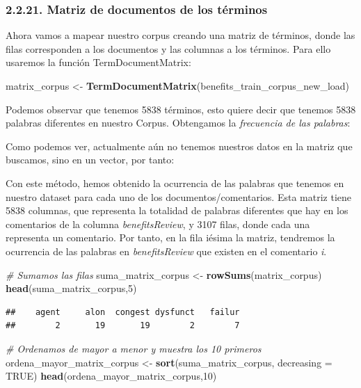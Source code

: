 \documentclass[spanish,]{article}
\newenvironment{Shaded}{\begin{snugshade}}{\end{snugshade}}
\newcommand{\KeywordTok}[1]{\textcolor[rgb]{0.13,0.29,0.53}{\textbf{#1}}}
\newcommand{\DataTypeTok}[1]{\textcolor[rgb]{0.13,0.29,0.53}{#1}}
\newcommand{\DecValTok}[1]{\textcolor[rgb]{0.00,0.00,0.81}{#1}}
\newcommand{\StringTok}[1]{\textcolor[rgb]{0.31,0.60,0.02}{#1}}
\newcommand{\CommentTok}[1]{\textcolor[rgb]{0.56,0.35,0.01}{\textit{#1}}}
\newcommand{\OtherTok}[1]{\textcolor[rgb]{0.56,0.35,0.01}{#1}}
\newcommand{\NormalTok}[1]{#1}
\begin{document}
\subsubsection{2.2.21. Matriz de documentos de los
términos}\label{matriz-de-documentos-de-los-terminos}

Ahora vamos a mapear nuestro corpus creando una matriz de términos,
donde las filas corresponden a los documentos y las columnas a los
términos. Para ello usaremos la función TermDocumentMatrix:

\begin{Shaded}
\begin{Highlighting}[]
\NormalTok{matrix_corpus <-}\StringTok{ }\KeywordTok{TermDocumentMatrix}\NormalTok{(benefits_train_corpus_new_load)}
\end{Highlighting}
\end{Shaded}

Podemos observar que tenemos 5838 términos, esto quiere decir que
tenemos 5838 palabras diferentes en nuestro Corpus. Obtengamos la
\emph{frecuencia de las palabras}:

Como podemos ver, actualmente aún no tenemos nuestros datos en la matriz
que buscamos, sino en un vector, por tanto:

Con este método, hemos obtenido la ocurrencia de las palabras que
tenemos en nuestro dataset para cada uno de los documentos/comentarios.
Esta matriz tiene 5838 columnas, que representa la totalidad de palabras
diferentes que hay en los comentarios de la columna
\textit{benefitsReview}, y 3107 filas, donde cada una representa un
comentario. Por tanto, en la fila iésima la matriz, tendremos la
ocurrencia de las palabras en \textit{benefitsReview} que existen en el
comentario \textit{i}.

\begin{Shaded}
\begin{Highlighting}[]
\CommentTok{# Sumamos las filas}
\NormalTok{suma_matrix_corpus <-}\StringTok{ }\KeywordTok{rowSums}\NormalTok{(matrix_corpus)}
\KeywordTok{head}\NormalTok{(suma_matrix_corpus,}\DecValTok{5}\NormalTok{)}
\end{Highlighting}
\end{Shaded}

\begin{verbatim}
##    agent     alon  congest dysfunct   failur 
##        2       19       19        2        7
\end{verbatim}

\begin{Shaded}
\begin{Highlighting}[]
\CommentTok{# Ordenamos de mayor a menor y muestra los 10 primeros}
\NormalTok{ordena_mayor_matrix_corpus <-}\StringTok{ }\KeywordTok{sort}\NormalTok{(suma_matrix_corpus, }\DataTypeTok{decreasing =} \OtherTok{TRUE}\NormalTok{)}
\KeywordTok{head}\NormalTok{(ordena_mayor_matrix_corpus,}\DecValTok{10}\NormalTok{)}
\end{Highlighting}
\end{Shaded}
\end{document}
